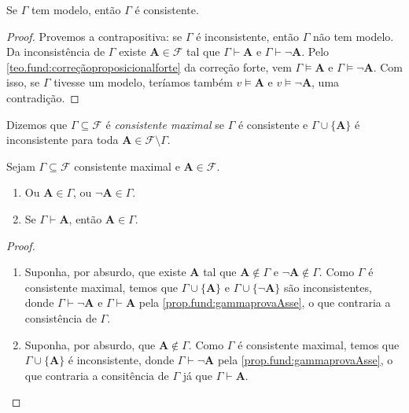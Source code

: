 \begin{corollary} \label{cor.fund:temmodeloehconsistente}
    Se $\Gamma$ tem modelo, então $\Gamma$ é consistente.
\end{corollary}

\begin{proof}
    Provemos a contrapositiva: se $\Gamma$ é inconsistente, então $\Gamma$ não tem modelo. Da inconsistência de $\Gamma$ existe $\mathbf{A} \in \mathcal{F}$ tal que $\Gamma \vdash \mathbf{A}$ e $\Gamma \vdash \neg \mathbf{A}$. Pelo \cref{teo.fund:correçãoproposicionalforte} da correção forte, vem $\Gamma \vDash \mathbf{A}$ e $\Gamma \vDash \neg \mathbf{A}$. Com isso, se $\Gamma$ tivesse um modelo, teríamos também $v \vDash \mathbf{A}$ e $v \vDash \neg \mathbf{A}$, uma contradição. \blackproof
\end{proof}

\begin{definition}
    Dizemos que $\Gamma \subseteq \mathcal{F}$ é \emph{consistente maximal} se $\Gamma$ é consistente e $\Gamma \cup \{\mathbf{A}\}$ é inconsistente para toda $\mathbf{A} \in \mathcal{F} \setminus \Gamma$.
\end{definition}

\begin{corollary}
    Sejam $\Gamma \subseteq \mathcal{F}$ consistente maximal e $\mathbf{A} \in \mathcal{F}$.
        \begin{enumerate}[leftmargin=*, align=left, label=\textbf{(\alph*)}]
            \item Ou $\mathbf{A} \in \Gamma$, ou $\neg \mathbf{A} \in \Gamma$.
            \item Se $\Gamma \vdash \mathbf{A}$, então $\mathbf{A} \in \Gamma$.
        \end{enumerate}
\end{corollary}

\begin{proof}
    \leavevmode
        \begin{enumerate}[leftmargin=*, align=left, label=\textbf{(\alph*)}]
            \item Suponha, por absurdo, que existe $\mathbf{A}$ tal que $\mathbf{A} \notin \Gamma$ e $\neg \mathbf{A} \notin \Gamma$. Como $\Gamma$ é consistente maximal, temos que $\Gamma \cup \{\mathbf{A}\}$ e $\Gamma \cup \{\neg \mathbf{A}\}$ são inconsistentes, donde $\Gamma \vdash \neg \mathbf{A}$ e $\Gamma \vdash \mathbf{A}$ pela \cref{prop.fund:gammaprovaAsse}, o que contraria a consistência de $\Gamma$. \blackproof
            \item Suponha, por absurdo, que $\mathbf{A} \notin \Gamma$. Como $\Gamma$ é consistente maximal, temos que $\Gamma \cup \{\mathbf{A}\}$ é inconsistente, donde $\Gamma \vdash \neg \mathbf{A}$ pela \cref{prop.fund:gammaprovaAsse}, o que contraria a consitência de $\Gamma$ já que $\Gamma \vdash \mathbf{A}$. \blackproof
        \end{enumerate}
\end{proof}

